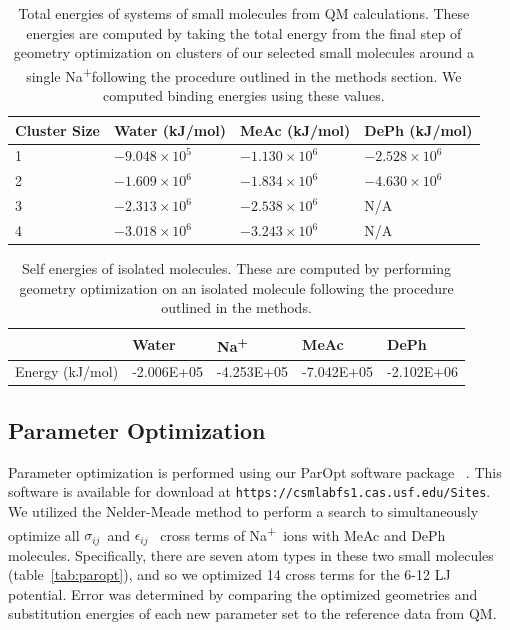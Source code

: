 \documentclass[12pt,openany,final]{book}
\newcommand{\sigmaij}{$\sigma_{ij}$}
\newcommand{\epsilonij}{$\epsilon_{ij}$}
\newcommand{\na}{Na\textsuperscript{+}}
\begin{document}
\begin{table}[h!]
    \caption[Total enegies of systems of small molecules...]{Total energies of systems of small molecules from QM calculations. 
These energies are computed by taking the total energy from the final step of geometry optimization 
on clusters of our selected small molecules around a single \na following
the procedure outlined in the methods section. We computed binding energies using these values.}
\label{tab:qmbinding}
\begin{tabularx}{\textwidth}{X|X|X|X}
    Cluster Size & Water (kJ/mol)& MeAc (kJ/mol) & DePh (kJ/mol)\\\hline
    1&$-9.048\times10^{5}$&$-1.130\times10^{6}$&$-2.528\times10^{6}$\\ \hline
    2&$-1.609\times10^{6}$&$-1.834\times10^{6}$&$-4.630\times10^{6}$\\\hline
    3&$-2.313\times10^{6}$&$-2.538\times10^{6}$& N/A \\\hline
    4&$-3.018\times10^{6}$&$-3.243\times10^{6}$& N/A \\\hline
\end{tabularx}
\end{table}
\begin{table}[h!]
    \caption[Self energies of isolated molecules]{Self 
    energies of isolated molecules. These are computed by performing geometry optimization on an isolated molecule following the procedure outlined in the methods.}
    \label{tab:qmself}
    {\footnotesize
\begin{tabularx}{\textwidth}{X|X|X|X|X}
               & Water         & \na           & MeAc          & DePh \\\hline
    Energy (kJ/mol)&-2.006E+05&-4.253E+05&-7.042E+05&-2.102E+06
\end{tabularx}
}
\end{table}

\subsection{Parameter Optimization}

Parameter optimization is performed using our ParOpt software package~
\cite{fogarty:2014:paropt,fogarty:2014:thesis}.
This software is available for download at
\texttt{https://csmlabfs1.cas.usf.edu/Sites}.
We utilized the Nelder-Meade method to perform a search to simultaneously optimize 
all \sigmaij~and \epsilonij~ cross terms of \na~ions with MeAc and DePh molecules. 
Specifically, there are seven atom types in these two small molecules (table~\ref{tab:paropt}), and so we optimized
14 cross terms for the 6-12 LJ potential.
Error was
determined by comparing the optimized
geometries and substitution energies of each new parameter set to the
reference data from QM.  
\end{document}
